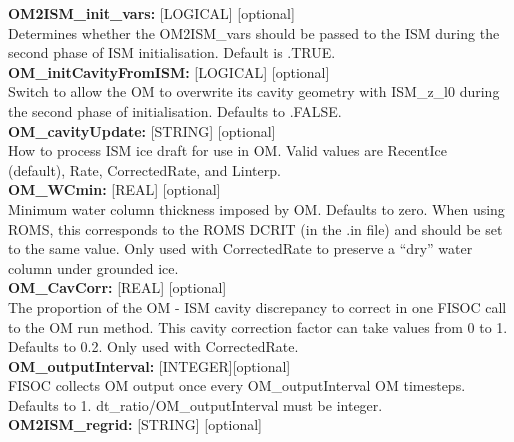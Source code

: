 \documentclass[11pt]{article}
\begin{document}
\begin{flushleft}
\vspace{6pt}
\textbf{OM2ISM\_init\_vars:}  [LOGICAL] [optional]                         \\
Determines whether the OM2ISM\_vars should be passed to the ISM during the 
second phase of ISM initialisation.   Default is .TRUE.                    \\ 
\vspace{6pt}
\textbf{OM\_initCavityFromISM:}  [LOGICAL] [optional]                      \\
Switch to allow the OM to overwrite its cavity geometry with ISM\_z\_l0 
during the second phase of initialisation.
Defaults to .FALSE.                                                        \\
\vspace{6pt}
\textbf{OM\_cavityUpdate:}   [STRING] [optional]                           \\
How to process ISM ice draft for use in OM.  Valid values are RecentIce    \\
(default), Rate, CorrectedRate, and Linterp.                               \\
\vspace{6pt}
\textbf{OM\_WCmin:}  [REAL] [optional]                                     \\
Minimum water column thickness imposed by OM.  Defaults to zero.  When 
using ROMS, this corresponds to the ROMS DCRIT (in the .in file) and 
should be set to the same value.  Only used with CorrectedRate to 
preserve a ``dry'' water column under grounded ice.                        \\
\vspace{6pt}
\textbf{OM\_CavCorr:}  [REAL] [optional]                                   \\
The proportion of the OM - ISM cavity discrepancy to correct in one 
FISOC call to the  OM run method. This cavity correction factor can take values from  0 to 1. Defaults to 0.2.  Only used with 
CorrectedRate.                                                             \\
\vspace{6pt}
\textbf{OM\_outputInterval:} [INTEGER][optional]                           \\
FISOC collects OM output once every OM\_outputInterval OM timesteps. 
Defaults to 1.  dt\_ratio/OM\_outputInterval must be integer.              \\
\vspace{6pt}
\textbf{OM2ISM\_regrid:}       [STRING] [optional]                         \\

\end{flushleft}
\end{document}
